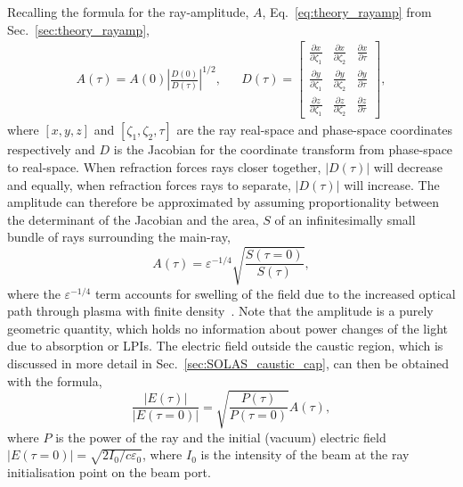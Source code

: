 Recalling the formula for the ray-amplitude, $A$, Eq.~\ref{eq:theory_rayamp} from Sec.~\ref{sec:theory_rayamp},
\begin{align}
    A(\tau) = A(0)\left| \frac{D(0)}{D(\tau)} \right|^{1/2}, &&
    D(\tau) = 
    \begin{bmatrix}
        \frac{\partial x}{\partial \zeta_1} & \frac{\partial x}{\partial \zeta_2} & \frac{\partial x}{\partial \tau} \\
        \frac{\partial y}{\partial \zeta_1} & \frac{\partial y}{\partial \zeta_2} & \frac{\partial y}{\partial \tau} \\
        \frac{\partial z}{\partial \zeta_1} & \frac{\partial z}{\partial \zeta_2} & \frac{\partial z}{\partial \tau}
    \end{bmatrix},
\end{align}
where $[x,y,z]$ and $[\zeta_1,\zeta_2,\tau]$ are the ray real-space and phase-space coordinates respectively and $D$ is the Jacobian for the coordinate transform from phase-space to real-space.
When refraction forces rays closer together, $|D(\tau)|$ will decrease and equally, when refraction forces rays to separate, $|D(\tau)|$ will increase.
The amplitude can therefore be approximated by assuming proportionality between the determinant of the Jacobian and the area, $S$ of an infinitesimally small bundle of rays surrounding the main-ray,
\begin{equation}
    A(\tau) = \varepsilon^{-1/4} \sqrt{\frac{S(\tau=0)}{S(\tau)}},
\end{equation}
where the $\varepsilon^{-1/4}$ term accounts for swelling of the field due to the increased optical path through plasma with finite density~\cite{follett_validation_2022}.
Note that the amplitude is a purely geometric quantity, which holds no information about power changes of the light due to absorption or \ac{LPIs}.
The electric field outside the caustic region, which is discussed in more detail in Sec.~\ref{sec:SOLAS_caustic_cap}, can then be obtained with the formula,
\begin{equation}
    \frac{|E(\tau)|}{|E(\tau=0)|} = \sqrt{\frac{P(\tau)}{P(\tau=0)}}A(\tau),
\end{equation}
where $P$ is the power of the ray and the initial (vacuum) electric field $|E(\tau=0)|=\sqrt{2I_0/c \varepsilon_0}$, where $I_0$ is the intensity of the beam at the ray initialisation point on the beam port.

